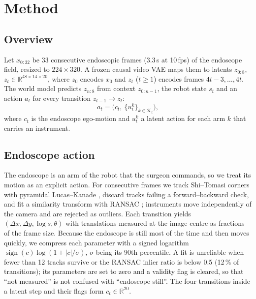 \section{Method}\label{sec:method}

\subsection{Overview}
Let $x_{0:32}$ be 33 consecutive endoscopic frames (3.3\,s at 10\,fps) of the endoscope field, resized to $224\times320$. A frozen causal video VAE \cite{wan} maps them to latents $z_{0:8}$, $z_t\in\mathbb{R}^{48\times14\times20}$, where $z_0$ encodes $x_0$ and $z_t$ ($t\ge1$) encodes frames $4t-3,\dots,4t$. The world model predicts $z_{n:8}$ from context $z_{0:n-1}$, the robot state $s_t$ and an action $a_t$ for every transition $z_{t-1}\to z_t$:
\begin{equation}
a_t=\big(c_t,\ \{u^k_t\}_{k\in\mathcal{K}_t}\big),
\end{equation}
where $c_t$ is the endoscope ego-motion and $u^k_t$ a latent action for each arm $k$ that carries an instrument.

\subsection{Endoscope action}
The endoscope is an arm of the robot that the surgeon commands, so we treat its motion as an explicit action. For consecutive frames we track Shi--Tomasi corners \cite{shitomasi} with pyramidal Lucas--Kanade \cite{lucaskanade}, discard tracks failing a forward--backward check, and fit a similarity transform with RANSAC \cite{ransac}; instruments move independently of the camera and are rejected as outliers. Each transition yields $(\Delta x,\Delta y,\log s,\theta)$ with translations measured at the image centre as fractions of the frame size. Because the endoscope is still most of the time and then moves quickly, we compress each parameter with a signed logarithm $\operatorname{sign}(c)\log(1+|c|/\sigma)$, $\sigma$ being its 90th percentile. A fit is unreliable when fewer than 12 tracks survive or the RANSAC inlier ratio is below 0.5 (12\,\% of transitions); its parameters are set to zero and a validity flag is cleared, so that ``not measured'' is not confused with ``endoscope still''. The four transitions inside a latent step and their flags form $c_t\in\mathbb{R}^{20}$.

